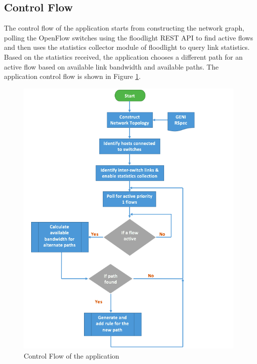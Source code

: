 \documentclass[paper=a4, fontsize=12pt]{scrartcl}	%
\numberwithin{equation}{section}		%
\numberwithin{figure}{section}			%
\numberwithin{table}{section}				%
\begin{document}
\subsection{Control Flow}
The control flow of the application starts from constructing the network graph, polling the OpenFlow switches using the floodlight REST API to find active flows and then uses the statistics collector module of floodlight to query link statistics. Based on the statistics received, the application chooses a different path for an active flow based on available link bandwidth and available paths. The application control flow is shown in Figure \ref{Flow}.
\begin{figure}
\begin{center}
\includegraphics[scale=0.65]{flowchart.png}   
\end{center}
 \caption{Control Flow of the application}
 \label{Flow}
\end{figure}
\end{document}
